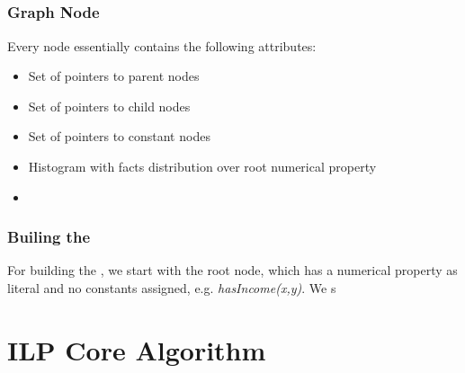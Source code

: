 \subsection{\graphname}

\subsubsection{Graph Node}

Every node essentially contains the following attributes:

\begin{itemize}
 \item Set of pointers to parent nodes
 \item Set of pointers to child nodes
 \item Set of pointers to constant nodes
 \item Histogram with facts distribution over root numerical property
 \item 
 
\end{itemize}


\subsubsection{Builing the \graphname}

For building the \graphname, we start with the root node, which has a numerical property as literal and no constants assigned, e.g. \emph{hasIncome(x,y)}. We s

\section{ILP Core Algorithm}


